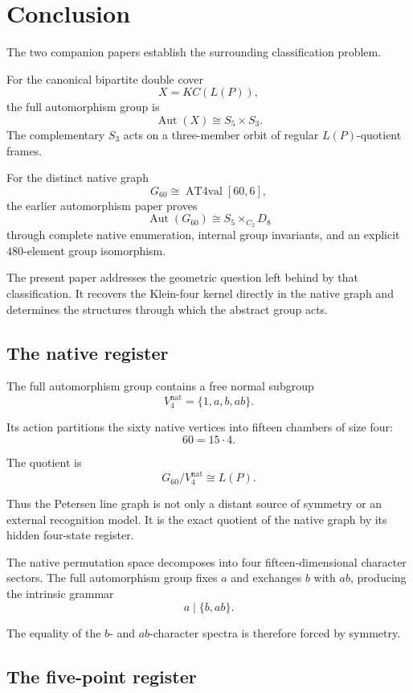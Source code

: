 \section{Conclusion}

The two companion papers establish the surrounding classification
problem.

For the canonical bipartite double cover
\[
X=KC(L(P)),
\]
the full automorphism group is
\[
\operatorname{Aut}(X)\cong S_5\times S_3.
\]
The complementary \(S_3\) acts on a three-member orbit of regular
\(L(P)\)-quotient frames.

For the distinct native graph
\[
G_{60}\cong\operatorname{AT4val}[60,6],
\]
the earlier automorphism paper proves
\[
\operatorname{Aut}(G_{60})
\cong
S_5\times_{C_2}D_8
\]
through complete native enumeration, internal group invariants, and an
explicit \(480\)-element group isomorphism.

The present paper addresses the geometric question left behind by that
classification. It recovers the Klein-four kernel directly in the
native graph and determines the structures through which the abstract
group acts.

\subsection{The native register}

The full automorphism group contains a free normal subgroup
\[
V_4^{\mathrm{nat}}
=
\{1,a,b,ab\}.
\]

Its action partitions the sixty native vertices into fifteen chambers
of size four:
\[
60=15\cdot4.
\]

The quotient is
\[
G_{60}/V_4^{\mathrm{nat}}
\cong
L(P).
\]

Thus the Petersen line graph is not only a distant source of symmetry
or an external recognition model. It is the exact quotient of the
native graph by its hidden four-state register.

The native permutation space decomposes into four
fifteen-dimensional character sectors. The full automorphism group
fixes \(a\) and exchanges \(b\) with \(ab\), producing the intrinsic
grammar
\[
a\mid\{b,ab\}.
\]

The equality of the \(b\)- and \(ab\)-character spectra is therefore
forced by symmetry.

\subsection{The five-point register}

